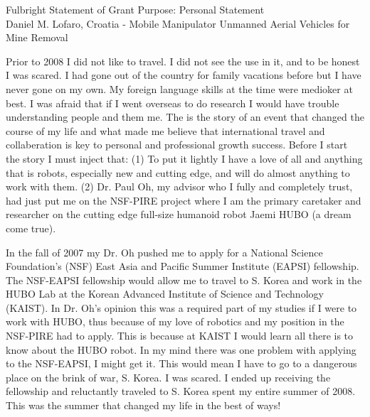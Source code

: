 \documentclass[12pt]{article}
\begin{document}
\begin{center}
Fulbright Statement of Grant Purpose: Personal Statement\\
Daniel M. Lofaro, Croatia - Mobile Manipulator Unmanned Aerial Vehicles for Mine Removal\\

\end{center}

\normalsize
Prior to 2008 I did not like to travel. 
I did not see the use in it, and to be honest I was scared.  
I had gone out of the country for family vacations before but I have never gone on my own.  
My foreign language skills at the time were medioker at best.  
I was afraid that if I went overseas to do research I would have trouble understanding people and them me.  
The is the story of an event that changed the course of my life and what made me believe that international travel and collaberation is key to personal and professional growth success.
Before I start the story I must inject that: 
(1) To put it lightly I have a love of all and anything that is robots, especially new and cutting edge, and will do almost anything to work with them.  
(2) Dr. Paul Oh, my advisor who I fully and completely trust, had just put me on the NSF-PIRE project where I am the primary caretaker and researcher on the cutting edge full-size humanoid robot Jaemi HUBO (a dream come true).  

In the fall of 2007 my Dr. Oh pushed me to apply for a National Science Foundation’s (NSF) East Asia and Pacific Summer Institute (EAPSI) fellowship.  
The NSF-EAPSI fellowship would allow me to travel to S. Korea and work in the HUBO Lab at the Korean Advanced Institute of Science and Technology (KAIST).  
In Dr. Oh's opinion this was a required part of my studies if I were to work with HUBO, thus because of my love of robotics and my position in the NSF-PIRE had to apply.
This is because at KAIST I would learn all there is to know about the HUBO robot.
In my mind there was one problem with applying to the NSF-EAPSI, I might get it.
This would mean I have to go to a dangerous place on the brink of war, S. Korea.
I was scared.  
I ended up receiving the fellowship and reluctantly traveled to S. Korea spent my entire summer of 2008.  
This was the summer that changed my life in the best of ways!  

\end{document}
